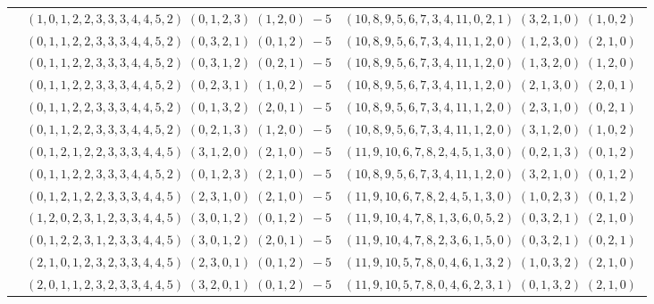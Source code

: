 \documentclass[11pt]{article}
\begin{document}
\begin{longtable}[l]{|c|c|c|}
 \cline{2-3} 
 & $(1 ,0 ,1 ,2 ,2 ,3 ,3 ,3 ,4 ,4 ,5 ,2) \;(0 ,1 ,2 ,3) \;(1 ,2 ,0) \;-5$ & $(10 ,8 ,9 ,5 ,6 ,7 ,3 ,4 ,11 ,0 ,2 ,1) \;(3 ,2 ,1 ,0) \;(1 ,0 ,2) \;$\\ 
 \cline{2-3} 
 & $(0 ,1 ,1 ,2 ,2 ,3 ,3 ,3 ,4 ,4 ,5 ,2) \;(0 ,3 ,2 ,1) \;(0 ,1 ,2) \;-5$ & $(10 ,8 ,9 ,5 ,6 ,7 ,3 ,4 ,11 ,1 ,2 ,0) \;(1 ,2 ,3 ,0) \;(2 ,1 ,0) \;$\\ 
 \cline{2-3} 
 & $(0 ,1 ,1 ,2 ,2 ,3 ,3 ,3 ,4 ,4 ,5 ,2) \;(0 ,3 ,1 ,2) \;(0 ,2 ,1) \;-5$ & $(10 ,8 ,9 ,5 ,6 ,7 ,3 ,4 ,11 ,1 ,2 ,0) \;(1 ,3 ,2 ,0) \;(1 ,2 ,0) \;$\\ 
 \cline{2-3} 
 & $(0 ,1 ,1 ,2 ,2 ,3 ,3 ,3 ,4 ,4 ,5 ,2) \;(0 ,2 ,3 ,1) \;(1 ,0 ,2) \;-5$ & $(10 ,8 ,9 ,5 ,6 ,7 ,3 ,4 ,11 ,1 ,2 ,0) \;(2 ,1 ,3 ,0) \;(2 ,0 ,1) \;$\\ 
 \cline{2-3} 
 & $(0 ,1 ,1 ,2 ,2 ,3 ,3 ,3 ,4 ,4 ,5 ,2) \;(0 ,1 ,3 ,2) \;(2 ,0 ,1) \;-5$ & $(10 ,8 ,9 ,5 ,6 ,7 ,3 ,4 ,11 ,1 ,2 ,0) \;(2 ,3 ,1 ,0) \;(0 ,2 ,1) \;$\\ 
 \cline{2-3} 
 & $(0 ,1 ,1 ,2 ,2 ,3 ,3 ,3 ,4 ,4 ,5 ,2) \;(0 ,2 ,1 ,3) \;(1 ,2 ,0) \;-5$ & $(10 ,8 ,9 ,5 ,6 ,7 ,3 ,4 ,11 ,1 ,2 ,0) \;(3 ,1 ,2 ,0) \;(1 ,0 ,2) \;$\\ 
 \cline{2-3} 
 & $(0 ,1 ,2 ,1 ,2 ,2 ,3 ,3 ,3 ,4 ,4 ,5) \;(3 ,1 ,2 ,0) \;(2 ,1 ,0) \;-5$ & $(11 ,9 ,10 ,6 ,7 ,8 ,2 ,4 ,5 ,1 ,3 ,0) \;(0 ,2 ,1 ,3) \;(0 ,1 ,2) \;$\\ 
 \cline{2-3} 
 & $(0 ,1 ,1 ,2 ,2 ,3 ,3 ,3 ,4 ,4 ,5 ,2) \;(0 ,1 ,2 ,3) \;(2 ,1 ,0) \;-5$ & $(10 ,8 ,9 ,5 ,6 ,7 ,3 ,4 ,11 ,1 ,2 ,0) \;(3 ,2 ,1 ,0) \;(0 ,1 ,2) \;$\\ 
 \cline{2-3} 
 & $(0 ,1 ,2 ,1 ,2 ,2 ,3 ,3 ,3 ,4 ,4 ,5) \;(2 ,3 ,1 ,0) \;(2 ,1 ,0) \;-5$ & $(11 ,9 ,10 ,6 ,7 ,8 ,2 ,4 ,5 ,1 ,3 ,0) \;(1 ,0 ,2 ,3) \;(0 ,1 ,2) \;$\\ 
 \cline{2-3} 
 & $(1 ,2 ,0 ,2 ,3 ,1 ,2 ,3 ,3 ,4 ,4 ,5) \;(3 ,0 ,1 ,2) \;(0 ,1 ,2) \;-5$ & $(11 ,9 ,10 ,4 ,7 ,8 ,1 ,3 ,6 ,0 ,5 ,2) \;(0 ,3 ,2 ,1) \;(2 ,1 ,0) \;$\\ 
 \cline{2-3} 
 & $(0 ,1 ,2 ,2 ,3 ,1 ,2 ,3 ,3 ,4 ,4 ,5) \;(3 ,0 ,1 ,2) \;(2 ,0 ,1) \;-5$ & $(11 ,9 ,10 ,4 ,7 ,8 ,2 ,3 ,6 ,1 ,5 ,0) \;(0 ,3 ,2 ,1) \;(0 ,2 ,1) \;$\\ 
 \cline{2-3} 
 & $(2 ,1 ,0 ,1 ,2 ,3 ,2 ,3 ,3 ,4 ,4 ,5) \;(2 ,3 ,0 ,1) \;(0 ,1 ,2) \;-5$ & $(11 ,9 ,10 ,5 ,7 ,8 ,0 ,4 ,6 ,1 ,3 ,2) \;(1 ,0 ,3 ,2) \;(2 ,1 ,0) \;$\\ 
 \cline{2-3} 
 & $(2 ,0 ,1 ,1 ,2 ,3 ,2 ,3 ,3 ,4 ,4 ,5) \;(3 ,2 ,0 ,1) \;(0 ,1 ,2) \;-5$ & $(11 ,9 ,10 ,5 ,7 ,8 ,0 ,4 ,6 ,2 ,3 ,1) \;(0 ,1 ,3 ,2) \;(2 ,1 ,0) \;$\\ 

\end{longtable}
\end{document}
